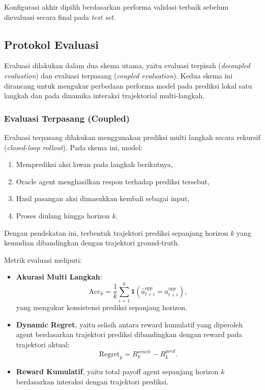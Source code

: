 Konfigurasi akhir dipilih berdasarkan performa validasi terbaik sebelum dievaluasi secara final pada \textit{test set}.


\subsection{Protokol Evaluasi}

Evaluasi dilakukan dalam dua skema utama, yaitu evaluasi terpisah (\textit{decoupled evaluation}) dan evaluasi terpasang (\textit{coupled evaluation}). Kedua skema ini dirancang untuk mengukur perbedaan performa model pada prediksi lokal satu langkah dan pada dinamika interaksi trajektorial multi-langkah.

\subsubsection{Evaluasi Terpasang (Coupled)}

Evaluasi terpasang dilakukan menggunakan prediksi multi langkah secara rekursif (\textit{closed-loop rollout}). Pada skema ini, model:

\begin{enumerate}
    \item Memprediksi aksi lawan pada langkah berikutnya,
    \item Oracle agent menghasilkan respon terhadap prediksi tersebut,
    \item Hasil pasangan aksi dimasukkan kembali sebagai input,
    \item Proses diulang hingga horizon $k$.
\end{enumerate}

Dengan pendekatan ini, terbentuk trajektori prediksi sepanjang horizon $k$ yang kemudian dibandingkan dengan trajektori ground-truth.

Metrik evaluasi meliputi:

\begin{itemize}
    \item \textbf{Akurasi Multi Langkah}:
    \[
    \text{Acc}_k
    =
    \frac{1}{k}
    \sum_{i=1}^{k}
    \mathbf{1}
    (\hat{a}_{t+i}^{opp} = a_{t+i}^{opp}),
    \]
    yang mengukur konsistensi prediksi sepanjang horizon.
    
    \item \textbf{Dynamic Regret}, yaitu selisih antara reward kumulatif yang diperoleh agent berdasarkan trajektori prediksi dibandingkan dengan reward pada trajektori aktual:
    \[
    \text{Regret}_k
    =
    R^{oracle}_k
    -
    R^{pred}_k.
    \]
    
    \item \textbf{Reward Kumulatif}, yaitu total payoff agent sepanjang horizon $k$ berdasarkan interaksi dengan trajektori prediksi.
\end{itemize}

